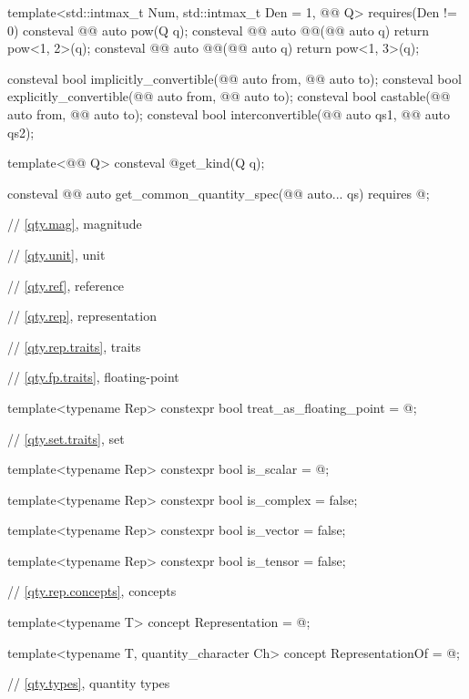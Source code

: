 \begin{codeblock}
{template<std::intmax_t Num, std::intmax_t Den = 1, @@ Q>
  requires(Den != 0)
consteval @@ auto pow(Q q);
consteval @@ auto @@(@@ auto q) { return pow<1, 2>(q); }
consteval @@ auto @@(@@ auto q) { return pow<1, 3>(q); }

consteval bool implicitly_convertible(@@ auto from, @@ auto to);
consteval bool explicitly_convertible(@@ auto from, @@ auto to);
consteval bool castable(@@ auto from, @@ auto to);
consteval bool interconvertible(@@ auto qs1, @@ auto qs2);

template<@@ Q>
consteval @\seebelownc@ get_kind(Q q);

consteval @@ auto get_common_quantity_spec(@@ auto... qs)
  requires @\seebelownc@;

// \ref{qty.mag}, magnitude

// \ref{qty.unit}, unit

// \ref{qty.ref}, reference

// \ref{qty.rep}, representation

// \ref{qty.rep.traits}, traits

// \ref{qty.fp.traits}, floating-point

template<typename Rep>
constexpr bool treat_as_floating_point = @\seebelownc@;

// \ref{qty.set.traits}, set

template<typename Rep>
constexpr bool is_scalar = @\seebelownc@;

template<typename Rep>
constexpr bool is_complex = false;

template<typename Rep>
constexpr bool is_vector = false;

template<typename Rep>
constexpr bool is_tensor = false;

// \ref{qty.rep.concepts}, concepts

template<typename T>
concept Representation = @\seebelownc@;

template<typename T, quantity_character Ch>
concept RepresentationOf = @\seebelownc@;

// \ref{qty.types}, quantity types

}
\end{codeblock}
